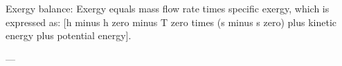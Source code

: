 Exergy balance:  
Exergy equals mass flow rate times specific exergy, which is expressed as:  
[h minus h zero minus T zero times (s minus s zero) plus kinetic energy plus potential energy].

---